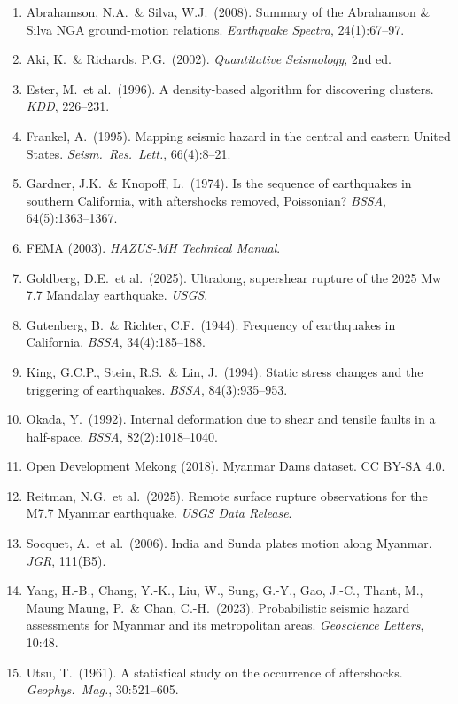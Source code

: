 \documentclass[11pt,a4paper]{article}
\begin{document}
\small
\begin{enumerate}
    \item Abrahamson, N.A.\ \& Silva, W.J.\ (2008). Summary of the Abrahamson \& Silva NGA ground-motion relations. \textit{Earthquake Spectra}, 24(1):67--97.
    \item Aki, K.\ \& Richards, P.G.\ (2002). \textit{Quantitative Seismology}, 2nd ed.
    \item Ester, M.\ et al.\ (1996). A density-based algorithm for discovering clusters. \textit{KDD}, 226--231.
    \item Frankel, A.\ (1995). Mapping seismic hazard in the central and eastern United States. \textit{Seism.\ Res.\ Lett.}, 66(4):8--21.
    \item Gardner, J.K.\ \& Knopoff, L.\ (1974). Is the sequence of earthquakes in southern California, with aftershocks removed, Poissonian? \textit{BSSA}, 64(5):1363--1367.
    \item FEMA (2003). \textit{HAZUS-MH Technical Manual}.
    \item Goldberg, D.E.\ et al.\ (2025). Ultralong, supershear rupture of the 2025 Mw 7.7 Mandalay earthquake. \textit{USGS}.
    \item Gutenberg, B.\ \& Richter, C.F.\ (1944). Frequency of earthquakes in California. \textit{BSSA}, 34(4):185--188.
    \item King, G.C.P., Stein, R.S.\ \& Lin, J.\ (1994). Static stress changes and the triggering of earthquakes. \textit{BSSA}, 84(3):935--953.
    \item Okada, Y.\ (1992). Internal deformation due to shear and tensile faults in a half-space. \textit{BSSA}, 82(2):1018--1040.
    \item Open Development Mekong (2018). Myanmar Dams dataset. CC BY-SA 4.0.
    \item Reitman, N.G.\ et al.\ (2025). Remote surface rupture observations for the M7.7 Myanmar earthquake. \textit{USGS Data Release}.
    \item Socquet, A.\ et al.\ (2006). India and Sunda plates motion along Myanmar. \textit{JGR}, 111(B5).
    \item Yang, H.-B., Chang, Y.-K., Liu, W., Sung, G.-Y., Gao, J.-C., Thant, M., Maung Maung, P.\ \& Chan, C.-H.\ (2023). Probabilistic seismic hazard assessments for Myanmar and its metropolitan areas. \textit{Geoscience Letters}, 10:48.
    \item Utsu, T.\ (1961). A statistical study on the occurrence of aftershocks. \textit{Geophys.\ Mag.}, 30:521--605.

\end{enumerate}
\end{document}
